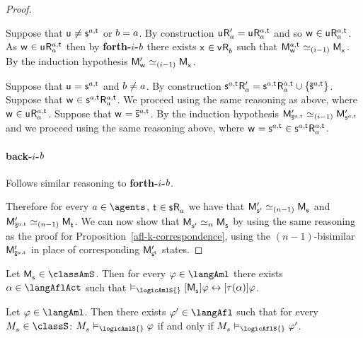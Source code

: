 \begin{proof}
\begin{enumerate}
        Suppose that $\aStateU \neq \aStateS[\agentA,\aStateT]$ or $b = a$.
        By construction $\aStateU \aAccessibilityP{\agentA} = \aStateU \aAccessibility[\agentA,\aStateT]{\agentA}$ and so $\aStateW \in \aStateU \aAccessibility[\agentA,\aStateT]{\agentA}$. 
        As $\aStateW \in \aStateU \aAccessibility[\agentA,\aStateT]{\agentA}$ then by {\bf forth-$i$-$b$} there exists $\aStateX \in \aStateV \aAccessibility{\agentB}$ such that $\aPModel[\agentA,\aStateT]{\aStateW} \bisimilar[(i - 1)] \aPModel{\aStateX}$.
        By the induction hypothesis $\aPModelP{\aStateW} \bisimilar[(i - 1)] \aPModel{\aStateX}$.

        Suppose that $\aStateU = \aStateS[\agentA,\aStateT]$ and $b \neq a$. 
        By construction $\aStateS[\agentA,\aStateT] \aAccessibilityP{\agentA} = \aStateS[\agentA,\aStateT] \aAccessibility[\agentA,\aStateT]{\agentA} \cup \{\aPStateS[\agentA,\aStateT]\}$. 
        Suppose that $\aStateW \in \aStateS[\agentA,\aStateT] \aAccessibility[\agentA,\aStateT]{\agentA}$. 
        We proceed using the same reasoning as above, where $\aStateW \in \aStateU \aAccessibility[\agentA,\aStateT]{\agentA}$. 
        Suppose that $\aStateW = \aPStateS[\agentA,\aStateT]$.
        By the induction hypothesis $\aPModelP{\aPStateS[\agentA,\aStateT]} \bisimilar[(i - 1)] \aPModelP{\aStateS[\agentA,\aStateT]}$ and we proceed using the same reasoning above, where $\aStateW = \aStateS[\agentA,\aStateT] \in \aStateS[\agentA,\aStateT] \aAccessibility[\agentA,\aStateT]{\agentA}$.

        \paragraph{back-$i$-$b$} Follows similar reasoning to {\bf forth-$i$-$b$}.
\end{enumerate}

Therefore for every $\agentA \in \agents$, $\aStateT \in \aStateS \aAccessibility{\agentA}$ we have that $\aPModelP{\aStateSP} \bisimilar[(n - 1)] \aPModel{\aStateS}$ and $\aPModelP{\aPStateS[\agentA,\aStateT]} \bisimilar[(n - 1)] \aPModel{\aStateT}$.
We can now show that $\aPModel{\aStateSP} \bisimilar[n] \aPModel{\aStateS}$ by using the same reasoning as the proof for Proposition~\ref{afl-k-correspondence}, using the $(n-1)$-bisimilar $\aPModelP{\aPStateS[\agentA,\aStateT]}$ in place of corresponding $\aPModelP{\aStateS[\aStateT]}$ states.
\end{proof}

\begin{corollary}
Let $\aPModel{\aStateS} \in \classAmS$.
Then for every $\phi \in \langAml$ there exists $\alpha \in \langAflAct$ such that $\entails_\logicAmlS{} \actionA{\aPModel{\aStateS}} \phi \iff \actionA{\tau(\alpha)} \phi$.
\end{corollary}

\begin{corollary}
Let $\phi \in \langAml$. 
Then there exists $\phi' \in \langAfl$ such that for every $\kPModel{\kStateS} \in \classS$: $\kPModel{\kStateS} \entails_\logicAmlS{} \phi$ if and only if $\kPModel{\kStateS} \entails_\logicAflS{} \phi'$.
\end{corollary}

